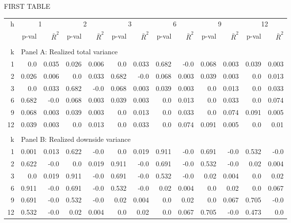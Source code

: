 \documentclass{article}
\begin{document}
FIRST TABLE

\begin{center}
\begin{tabular}{@{\extracolsep{6pt}}rrrrrrrrrrrrr@{}}

\hline

h & \multicolumn{2}{c}{1} & \multicolumn{2}{c}{2} & \multicolumn{2}{c}{3} & \multicolumn{2}{c}{6} & \multicolumn{2}{c}{9} & \multicolumn{2}{c}{12} \\[6pt]

\cline{2-3} \cline{4-5} \cline{6-7} \cline{8-9} \cline{10-11} \cline{12-13}

 & p-val & $\bar{R}^{2}$ & p-val & $\bar{R}^{2}$ &  p-val & $\bar{R}^{2}$ &  
 p-val & $\bar{R}^{2}$ &  p-val & $\bar{R}^{2}$ &  p-val & $\bar{R}^{2}$ \\[6pt]
 
\hline\\[0.000000001pt]

k & \multicolumn{12}{l}{Panel A: Realized total variance} \\[7pt]

\hline

1 & 0.0 & 0.035 & 0.026 & 0.006 & 0.0 & 0.033 & 0.682 & -0.0 & 0.068 & 0.003 & 0.039 & 0.003 \\[6pt]
2 & 0.026 & 0.006 & 0.0 & 0.033 & 0.682 & -0.0 & 0.068 & 0.003 & 0.039 & 0.003 & 0.0 & 0.013 \\[6pt]
3 & 0.0 & 0.033 & 0.682 & -0.0 & 0.068 & 0.003 & 0.039 & 0.003 & 0.0 & 0.013 & 0.0 & 0.033 \\[6pt]
6 & 0.682 & -0.0 & 0.068 & 0.003 & 0.039 & 0.003 & 0.0 & 0.013 & 0.0 & 0.033 & 0.0 & 0.074 \\[6pt]
9 & 0.068 & 0.003 & 0.039 & 0.003 & 0.0 & 0.013 & 0.0 & 0.033 & 0.0 & 0.074 & 0.091 & 0.005 \\[6pt]
12 & 0.039 & 0.003 & 0.0 & 0.013 & 0.0 & 0.033 & 0.0 & 0.074 & 0.091 & 0.005 & 0.0 & 0.01 \\[6pt]
 
\hline\\[0.000000001pt]

k & \multicolumn{12}{l}{Panel B: Realized downside variance} \\[7pt]

\hline

1 & 0.001 & 0.013 & 0.622 & -0.0 & 0.0 & 0.019 & 0.911 & -0.0 & 0.691 & -0.0 & 0.532 & -0.0 \\[6pt]
2 & 0.622 & -0.0 & 0.0 & 0.019 & 0.911 & -0.0 & 0.691 & -0.0 & 0.532 & -0.0 & 0.02 & 0.004 \\[6pt]
3 & 0.0 & 0.019 & 0.911 & -0.0 & 0.691 & -0.0 & 0.532 & -0.0 & 0.02 & 0.004 & 0.0 & 0.02 \\[6pt]
6 & 0.911 & -0.0 & 0.691 & -0.0 & 0.532 & -0.0 & 0.02 & 0.004 & 0.0 & 0.02 & 0.0 & 0.067 \\[6pt]
9 & 0.691 & -0.0 & 0.532 & -0.0 & 0.02 & 0.004 & 0.0 & 0.02 & 0.0 & 0.067 & 0.705 & -0.0 \\[6pt]
12 & 0.532 & -0.0 & 0.02 & 0.004 & 0.0 & 0.02 & 0.0 & 0.067 & 0.705 & -0.0 & 0.473 & 0.0 \\[6pt]


\end{tabular}
\end{center}
\end{document}
